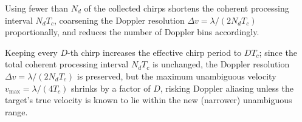 \begin{remark}[Cropping]
Using fewer than $N_d$ of the collected chirps shortens the coherent processing interval $N_dT_c$, coarsening the Doppler resolution $\Delta v = \lambda/(2N_dT_c)$ proportionally, and reduces the number of Doppler bins accordingly.
\end{remark}

\begin{remark}[Decimation]
Keeping every $D$-th chirp increases the effective chirp period to $DT_c$; since the total coherent processing interval $N_dT_c$ is unchanged, the Doppler resolution $\Delta v = \lambda/(2N_dT_c)$ is preserved, but the maximum unambiguous velocity $v_{\max} = \lambda/(4T_c)$ shrinks by a factor of $D$, risking Doppler aliasing unless the target's true velocity is known to lie within the new (narrower) unambiguous range.
\end{remark}

